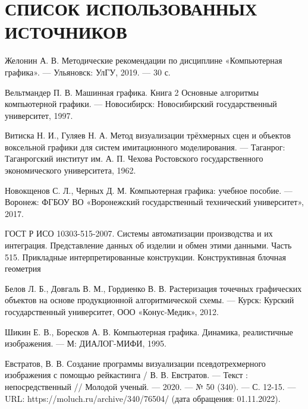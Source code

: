 \section*{СПИСОК ИСПОЛЬЗОВАННЫХ ИСТОЧНИКОВ}

\begingroup
\renewcommand{\section}[2]{}

\begin{thebibliography}{}
	Желонин А. В. Методические рекомендации по дисциплине «Компьютерная графика». --- Ульяновск: УлГУ, 2019. --- 30 с.
	
	Вельтмандер П. В. Машинная графика. Книга 2 Основные алгоритмы компьютерной графики. --- Новосибирск: Новосибирский государственный университет, 1997.
	
	Витиска Н. И., Гуляев Н. А. Метод визуализации трёхмерных сцен и объектов воксельной графики для систем имитационного моделирования. --- Таганрог: Таганрогский институт им. А. П. Чехова Ростовского государственного экономического университета, 1962.
	
	Новокщенов С. Л., Черных Д. М. Компьютерная графика: учебное пособие. --- Воронеж: ФГБОУ ВО
	«Воронежский государственный технический университет», 2017.
	
	ГОСТ Р ИСО 10303-515-2007. Системы автоматизации производства и их интеграция. Представление данных об изделии и обмен этими данными. Часть 515. Прикладные интерпретированные конструкции. Конструктивная блочная геометрия
	
	Белов Л. Б., Довгаль В. М., Гордиенко В. В. Растеризация точечных графических объектов на основе продукционной алгоритмической схемы. --- Курск: Курский государственный университет, ООО «Конус-Медик», 2012.
	
	Шикин Е. В., Боресков А. В. Компьютерная графика. Динамика, реалистичные изображения. --- М: ДИАЛОГ-МИФИ, 1995.
	
	Евстратов, В. В. Создание программы визуализации псевдотрехмерного изображения с помощью рейкастинга / В. В. Евстратов. — Текст : непосредственный // Молодой ученый. — 2020. — № 50 (340). — С. 12-15. — URL: https://moluch.ru/archive/340/76504/ (дата обращения: 01.11.2022).
	

\end{thebibliography}
